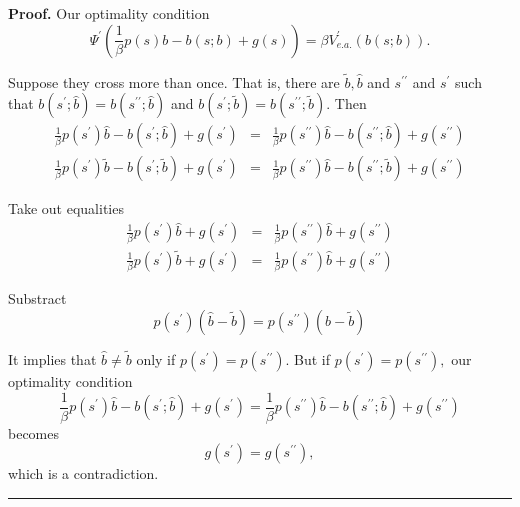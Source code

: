\documentclass{article}
\newenvironment{proof}[1][Proof]{\noindent\textbf{#1.} }{\ \rule{0.5em}{0.5em}}
\begin{document}
\begin{proof}
Our optimality condition%
\[
\Psi ^{\prime }\left( \frac{1}{\beta }p\left( s\right) b-b\left( s;b\right)
+g\left( s\right) \right) =\beta V_{e.a.}^{\prime }\left( b\left( s;b\right)
\right) . 
\]

Suppose they cross more than once. That is, there are $\tilde{b},\hat{b}$
and $s^{\prime \prime }$ and $s^{\prime }$ such that $b\left( s^{\prime };%
\hat{b}\right) =b\left( s^{\prime \prime };\hat{b}\right) $ and $b\left(
s^{\prime };\tilde{b}\right) =b\left( s^{\prime \prime };\tilde{b}\right) .$
Then 
\begin{eqnarray*}
\frac{1}{\beta }p\left( s^{\prime }\right) \hat{b}-b\left( s^{\prime };\hat{b%
}\right) +g\left( s^{\prime }\right) &=&\frac{1}{\beta }p\left( s^{\prime
\prime }\right) \hat{b}-b\left( s^{\prime \prime };\hat{b}\right) +g\left(
s^{\prime \prime }\right) \\
\frac{1}{\beta }p\left( s^{\prime }\right) \tilde{b}-b\left( s^{\prime };%
\tilde{b}\right) +g\left( s^{\prime }\right) &=&\frac{1}{\beta }p\left(
s^{\prime \prime }\right) \hat{b}-b\left( s^{\prime \prime };\tilde{b}%
\right) +g\left( s^{\prime \prime }\right)
\end{eqnarray*}

Take out equalities 
\begin{eqnarray*}
\frac{1}{\beta }p\left( s^{\prime }\right) \hat{b}+g\left( s^{\prime
}\right) &=&\frac{1}{\beta }p\left( s^{\prime \prime }\right) \hat{b}%
+g\left( s^{\prime \prime }\right) \\
\frac{1}{\beta }p\left( s^{\prime }\right) \tilde{b}+g\left( s^{\prime
}\right) &=&\frac{1}{\beta }p\left( s^{\prime \prime }\right) \hat{b}%
+g\left( s^{\prime \prime }\right)
\end{eqnarray*}

Substract%
\[
p\left( s^{\prime }\right) \left( \hat{b}-\tilde{b}\right) =p\left(
s^{\prime \prime }\right) \left( \hat{b}-\tilde{b}\right) 
\]

It implies that $\hat{b}\neq \tilde{b}$ only if $p\left( s^{\prime }\right)
=p\left( s^{\prime \prime }\right) .$ But if $p\left( s^{\prime }\right)
=p\left( s^{\prime \prime }\right) ,$ our optimality condition 
\[
\frac{1}{\beta }p\left( s^{\prime }\right) \hat{b}-b\left( s^{\prime };\hat{b%
}\right) +g\left( s^{\prime }\right) =\frac{1}{\beta }p\left( s^{\prime
\prime }\right) \hat{b}-b\left( s^{\prime \prime };\hat{b}\right) +g\left(
s^{\prime \prime }\right) 
\]%
becomes%
\[
g\left( s^{\prime }\right) =g\left( s^{\prime \prime }\right) , 
\]%
which is a contradiction.
\end{proof}
\end{document}
